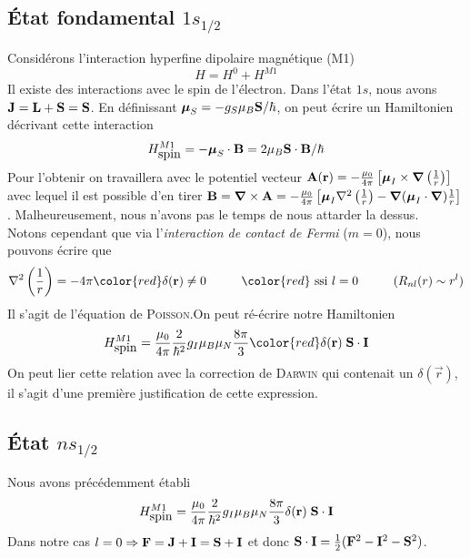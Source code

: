 \subsection{État fondamental $1s_{1/2}$}
Considérons l'interaction hyperfine dipolaire magnétique (M1)
\begin{equation}
H = H^0 + H^{M1}
\end{equation}
Il existe des interactions avec le spin de l'électron. Dans l'état $1s$, nous avons 
${\bf J} = {\bf L} + {\bf S} = {\bf S}$. En définissant $\mbox{\boldmath $ \mu $}_S = -g_S \mu_B {\bf
S}/ \hbar$, on peut écrire un Hamiltonien décrivant cette interaction
\begin{equation}
H^{M1}_{\mbox{spin}} = - \mbox{\boldmath $ \mu $}_S \cdot 
{\bf B} = 2 \mu_B {\bf S} \cdot {\bf B} / \hbar
\end{equation}
Pour l'obtenir on travaillera avec le potentiel vecteur ${\bf A} ({\bf r}) = - \frac{\mu_0}{4 \pi}
\left[ \mbox{\boldmath $ \mu $}_I \times \mbox{\boldmath $ \nabla $} \left( \frac{1}{r} \right)
\right]$ avec lequel il est possible d'en tirer ${\bf B} = \mbox{\boldmath $ \nabla $} \times {\bf A}
= -\frac{\mu_0}{4 \pi} \left[\mbox{\boldmath $ \mu $}_I \nabla^2 \left( \frac{1}{r}  \right)
 - \mbox{\boldmath $ \nabla $} ( \mbox{\boldmath $ \mu $}_I \cdot \mbox{\boldmath $ \nabla $} )
\frac{1}{r} \right]$. Malheureusement, nous n'avons pas le temps de nous attarder la dessus.\\

Notons cependant que via l'\textit{interaction de contact de Fermi} ($m=0$), nous pouvons écrire
que
\begin{equation}
\nabla^2 \left( \frac{1}{r} \right)  
= -4 \pi {\color{red} \delta ({\bf r})  } \neq 0 
\hspace*{1cm}
{\color{red} ~\mbox{ssi}~l=0  }
\hspace*{1cm} (R_{nl} (r) \sim r^l )
\end{equation}
Il s'agit de l'équation de \textsc{Poisson}.On peut ré-écrire notre Hamiltonien
\begin{equation}
H^{M1}_{\mbox{spin}}  =  
\frac{\mu_0}{4 \pi} \frac{2}{\hbar^2} 
g_I \mu_B \mu_N 
\frac{8 \pi}{3} 
{\color{red}  \delta( {\bf r})}
\;  {\bf S} \cdot {\bf I}
\end{equation}
On peut lier cette relation avec la correction de \textsc{Darwin} qui contenait un $\delta(\vec{r})$,
il s'agit d'une première justification de cette expression.


\subsection{État $ns_{1/2}$}
Nous avons précédemment établi 
\begin{equation}
H^{M1}_{\mbox{spin}}  =  \frac{\mu_0}{4 \pi} \frac{2}{\hbar^2} g_I \mu_B \mu_N \frac{8 \pi}{3} \delta( {\bf r})
\;  {\bf S} \cdot {\bf I}
\end{equation}
Dans notre cas $l = 0 \Rightarrow {\bf F} = {\bf J} + {\bf I} =  {\bf S} + {\bf I}$ et donc 
${\bf S} \cdot {\bf I} = \frac{1}{2} ({\bf F}^2 - {\bf I}^2 - {\bf S}^2)$.\\

